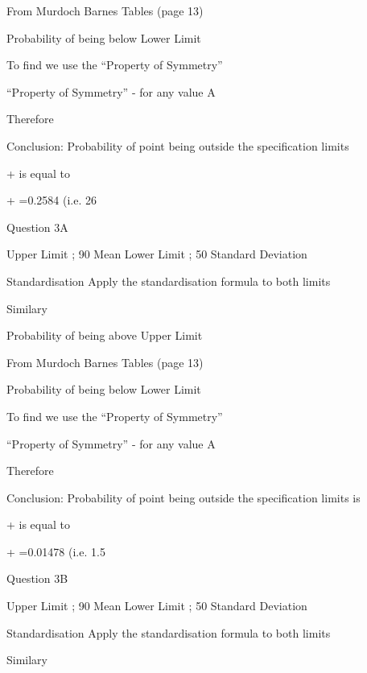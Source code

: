 \documentclass[a4]{beamer}
\begin{document}
From Murdoch Barnes Tables (page 13)  

Probability of being below Lower Limit


To find   we use the “Property of Symmetry”

“Property of Symmetry” -   for any value A
							
Therefore 

Conclusion: 
Probability of point being outside the specification limits 

 + is equal to

 + =0.2584 	(i.e. 26%














Question 3A

Upper Limit ; 90		Mean		 	
Lower Limit ; 50		Standard Deviation	 

Standardisation
Apply the standardisation formula	 	to both limits

 
Similary

 

Probability of being above Upper Limit

From Murdoch Barnes Tables (page 13)  

Probability of being below Lower Limit


To find   we use the “Property of Symmetry”

“Property of Symmetry” -   for any value A
							
Therefore 

Conclusion: 
Probability of point being outside the specification limits is

 + is equal to


 + =0.01478  	(i.e. 1.5%















Question 3B

Upper Limit ; 90		Mean		 	
Lower Limit ; 50		Standard Deviation	 

Standardisation
Apply the standardisation formula	 	to both limits

 
Similary

 
\end{document}
